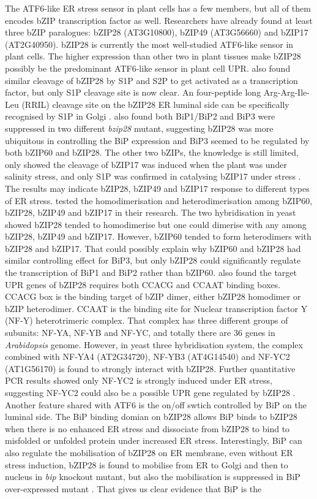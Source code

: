 The ATF6-like ER stress sensor in plant cells has a few members, but all of them encodes bZIP transcription factor as well. Researchers have already found at least three bZIP paralogues: bZIP28 (AT3G10800), bZIP49 (AT3G56660) and bZIP17 (AT2G40950). bZIP28 is currently the most well-studied ATF6-like sensor in plant cells. The higher expression than other two in plant tissues make bZIP28 possibly be the predominant ATF6-like sensor in plant cell UPR. \citet{liu2007endoplasmic} also found similar cleavage of bZIP28 by S1P and S2P to get activated as a transcription factor, but only S1P cleavage site is now clear. An four-peptide long Arg-Arg-Ile-Leu (RRIL) cleavage site on the bZIP28 ER luminal side can be specifically recognised by S1P in Golgi \citep{srivastava2012elements}. \citet{liu2007endoplasmic} also found both BiP1/BiP2 and BiP3 were suppressed in two different \textit{bzip28} mutant, suggesting bZIP28 was more ubiquitous in controlling the BiP expression and BiP3 seemed to be regulated by both bZIP60 and bZIP28. The other two bZIPs, the knowledge is still limited, only \citet{liu2008salt} showed the cleavage of bZIP17 was induced when the plant was under salinity stress, and only S1P was confirmed in catalysing bZIP17 under stress \citep{liu2007salt}. The results may indicate bZIP28, bZIP49 and bZIP17 response to different types of ER stress. \citet{liu2010bzip28} tested the homodimerisation and heterodimerisation among bZIP60, bZIP28, bZIP49 and bZIP17 in their research. The two hybridisation in yeast showed bZIP28 tended to homodimerise but one could dimerise with any among bZIP28, bZIP49 and bZIP17. However, bZIP60 tended to form heterodimers with bZIP28 and bZIP17. That could possibly explain why bZIP60 and bZIP28 had similar controlling effect for BiP3, but only bZIP28 could significantly regulate the transcription of BiP1 and BiP2 rather than bZIP60. \citet{liu2010bzip28} also found the target UPR genes of bZIP28 requires both CCACG and CCAAT binding boxes. CCACG box is the binding target of bZIP dimer, either bZIP28 homodimer or bZIP heterodimer. CCAAT is the binding site for Nuclear transcription factor Y (NF-Y) heterotrimeric complex. That complex has three different groups of subunits: NF-YA, NF-YB and NF-YC, and totally there are 36 genes in \textit{Arabidopsis} genome. However, in yeast three hybridisation system, the complex combined with NF-YA4 (AT2G34720), NF-YB3 (AT4G14540) and NF-YC2 (AT1G56170) is found to strongly interact with bZIP28. Further quantitative PCR results showed only NF-YC2 is strongly induced under ER stress, suggesting NF-YC2 could also be a possible UPR gene regulated by bZIP28 \citep{liu2010bzip28}. Another feature shared with ATF6 is the on/off swtich controlled by BiP on the luminal side. The BiP binding domian on bZIP28 allows BiP binds to bZIP28 when there is no enhanced ER stress and dissociate from bZIP28 to bind to misfolded or unfolded protein under increased ER stress. Interestingly, BiP can also regulate the mobilisation of bZIP28 on ER membrane, even without ER stress induction, bZIP28 is found to mobilise from ER to Golgi and then to nucleus in \textit{bip} knockout mutant, but also the mobilisation is suppressed in BiP over-expressed mutant \citep{srivastava2013binding}. That gives us clear evidence that BiP is the 